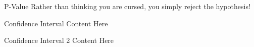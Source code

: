 \documentclass{beamer}\usepackage[]{graphicx}\usepackage[]{color}
\begin{document}
\begin{darkframes}
\begin{frame}[label=lists]{P-Value}
		Rather than thinking you are cursed, you simply reject the hypothesis!
	\end{frame}
	
	

	

	
	\begin{frame}[label=lists]{Confidence Interval}
		Content Here
	\end{frame}
	
	
	\begin{frame}[label=lists]{Confidence Interval 2}
		Content Here
	\end{frame} 
	

\end{darkframes}
  
  
  
\end{document}
